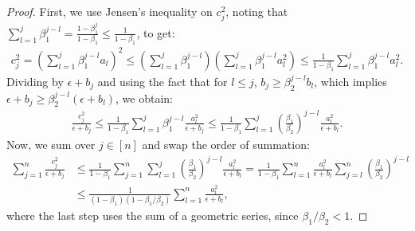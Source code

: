 \documentclass[11pt, letterpaper]{article}
\begin{document}
\begin{proof}
First, we use Jensen's inequality on $c_j^2$, noting that $\sum_{l=1}^j \beta_1^{j-l} = \frac{1-\beta_1^j}{1-\beta_1} \leq \frac{1}{1-\beta_1}$, to get:
\begin{align*}
    c_{j}^2 = \left(\sum_{l=1}^j \beta_1^{j - l}a_l\right)^2 \leq \left(\sum_{l=1}^j \beta_1^{j-l}\right) \left(\sum_{l=1}^j \beta_1^{j - l}a_l^2\right) \leq \frac{1}{1 - \beta_1}\sum_{l=1}^j \beta_1^{j - l}a_l^2.
\end{align*}
Dividing by $\epsilon + b_j$ and using the fact that for $l \leq j$, $b_j \geq \beta_2^{j-l}b_l$, which implies $\epsilon + b_j \geq \beta_2^{j-l}(\epsilon + b_l)$, we obtain:
\begin{align}
    \frac{c_{j}^2}{\epsilon + b_{j}} \leq \frac{1}{1 - \beta_1}\sum_{l=1}^j \beta_1^{j - l} \frac{a_l^2}{\epsilon + b_j} \leq \frac{1}{1 - \beta_1}\sum_{l=1}^j \left(\frac{\beta_1}{\beta_2}\right)^{j-l}\frac{a_l^2}{\epsilon + b_l}.
\end{align}
Now, we sum over $j \in [n]$ and swap the order of summation:
\begin{align}
\nonumber
    \sum_{j=1}^n \frac{c_{j}^2}{\epsilon + b_{j}} &\leq  \frac{1}{1 - \beta_1}\sum_{j=1}^n\sum_{l=1}^{j}\left(\frac{\beta_1}{\beta_2}\right)^{j -l} \frac{a_{l}^2}{\epsilon + b_{l}}
    = \frac{1}{1 - \beta_1}\sum_{l=1}^n\frac{a_l^2}{\epsilon + b_l}\sum_{j=l}^{n}\left(\frac{\beta_1}{\beta_2}\right)^{j -l} \\
    &\leq \frac{1}{(1 - \beta_1)(1 - \beta_1 /\beta_2)}\sum_{l=1}^n\frac{a_l^2}{\epsilon + b_l}, \label{eq:intermediate_bound_lemma7}
\end{align}
where the last step uses the sum of a geometric series, since $\beta_1/\beta_2 < 1$.


\end{proof}
\end{document}
